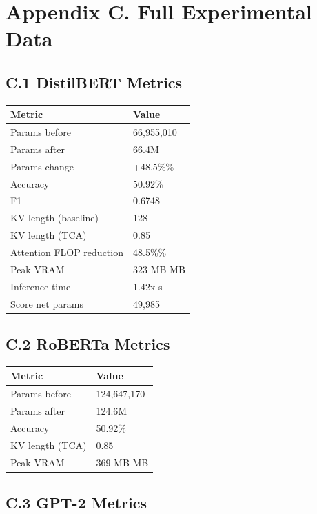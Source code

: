 \section{Appendix C. Full Experimental Data}

\subsection{C.1 DistilBERT Metrics}

\begin{table}[H]
\centering
\small
\begin{tabular}{ll}
\toprule
\textbf{Metric} & \textbf{Value} \\
\midrule
Params before & 66,955,010 \\
Params after & 66.4M \\
Params change & +48.5\%\% \\
Accuracy & 50.92\% \\
F1 & 0.6748 \\
KV length (baseline) & 128 \\
KV length (TCA) & 0.85 \\
Attention FLOP reduction & 48.5\%\% \\
Peak VRAM & 323 MB MB \\
Inference time & 1.42x s \\
Score net params & 49,985 \\
\bottomrule
\end{tabular}
\end{table}

\subsection{C.2 RoBERTa Metrics}

\begin{table}[H]
\centering
\small
\begin{tabular}{ll}
\toprule
\textbf{Metric} & \textbf{Value} \\
\midrule
Params before & 124,647,170 \\
Params after & 124.6M \\
Accuracy & 50.92\% \\
KV length (TCA) & 0.85 \\
Peak VRAM & 369 MB MB \\
\bottomrule
\end{tabular}
\end{table}

\subsection{C.3 GPT-2 Metrics}

